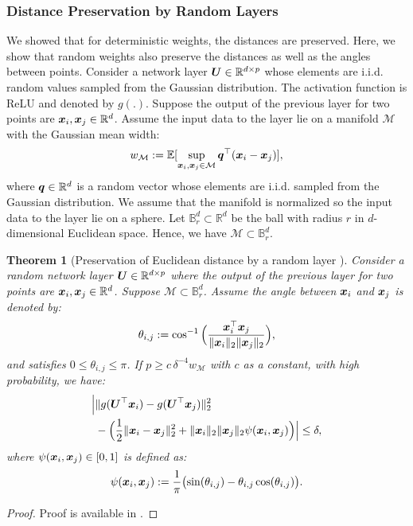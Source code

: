 \documentclass{article}
\newtheorem{theorem}{Theorem}
\def\b{\ensuremath\boldsymbol}
\begin{document}
\subsubsection{Distance Preservation by Random Layers}

We showed that for deterministic weights, the distances are preserved. Here, we show that random weights also preserve the distances as well as the angles between points.  
Consider a network layer $\b{U} \in \mathbb{R}^{d \times p}$ whose elements are i.i.d. random values sampled from the Gaussian distribution. The activation function is ReLU and denoted by $g(.)$.
Suppose the output of the previous layer for two points are $\b{x}_i, \b{x}_j \in \mathbb{R}^d$. Assume the input data to the layer lie on a manifold $\mathcal{M}$ with the Gaussian mean width:
\begin{align*}
w_\mathcal{M} := \mathbb{E}[\sup_{\b{x}_i, \b{x}_j \in \mathcal{M}} \b{q}^\top (\b{x}_i - \b{x}_j)],
\end{align*}
where $\b{q} \in \mathbb{R}^d$ is a random vector whose elements are i.i.d. sampled from the Gaussian distribution. 
We assume that the manifold is normalized so the input data to the layer lie on a sphere. 
Let $\mathbb{B}_r^d \subset \mathbb{R}^d$ be the ball with radius $r$ in $d$-dimensional Euclidean space. Hence, we have $\mathcal{M} \subset \mathbb{B}_r^d$. 

\begin{theorem}[Preservation of Euclidean distance by a random layer {\citep[Theorem 3]{giryes2016deep}}]\label{theorem_random_layer_Euclidean_preservation}
Consider a random network layer $\b{U} \in \mathbb{R}^{d \times p}$ where the output of the previous layer for two points are $\b{x}_i, \b{x}_j \in \mathbb{R}^d$. Suppose $\mathcal{M} \subset \mathbb{B}_r^d$.
Assume the angle between $\b{x}_i$ and $\b{x}_j$ is denoted by:
\begin{align*}
\theta_{i,j} := \cos^{-1}\Big(\frac{\b{x}_i^\top \b{x}_j}{\|\b{x}_i\|_2 \|\b{x}_j\|_2}\Big),
\end{align*}
and satisfies $0 \leq \theta_{i,j} \leq \pi$. If $p \geq c\, \delta^{-4} w_\mathcal{M}$ with $c$ as a constant, with high probability, we have:
\begin{align}
\Big| &\|g(\b{U}^\top \b{x}_i) - g(\b{U}^\top \b{x}_j)\|_2^2 \nonumber\\
&- \Big( \frac{1}{2} \|\b{x}_i - \b{x}_j\|_2^2 + \|\b{x}_i\|_2 \|\b{x}_j\|_2 \psi(\b{x}_i, \b{x}_j) \Big) \Big| \leq \delta, \label{equation_random_layer_Euclidean_preservation}
\end{align}
where $\psi(\b{x}_i, \b{x}_j) \in [0,1]$ is defined as:
\begin{align}
\psi(\b{x}_i, \b{x}_j) := \frac{1}{\pi}\big(\!\sin(\theta_{i,j}) - \theta_{i,j} \cos(\theta_{i,j})\big).
\end{align}
\end{theorem}
\begin{proof}
Proof is available in {\citep[Appendix A]{giryes2016deep}}.
\end{proof}
\end{document}
